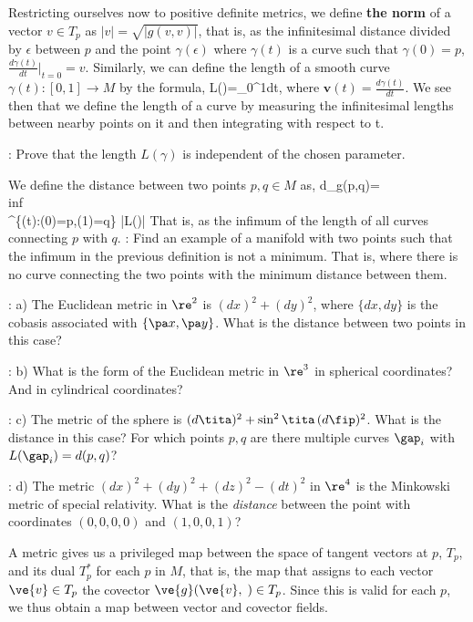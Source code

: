 Restricting ourselves now to positive definite metrics,
we define {\bf the norm} of a vector $v \in T_p$ as
$|v| = \sqrt{|g(v,v)|} $, that is, as the infinitesimal distance divided
by $\epsilon$ between $p$ and the point $\gamma (\epsilon)$ where
$\gamma(t)$ is a curve such that $\gamma (0) = p$, 
$\frac{d\gamma(t)}{dt}|_{t=0} = v$.
Similarly, we can define the length of a smooth curve
$\gamma(t):[0,1] \rightarrow M$ by the formula,
\beq
L(\lap)=\int_0^1\;dt,
\eeq
where $\mathbf{v}(t)=\frac{d\gamma(t)}{dt} $. We see then that we define the
length of a curve by measuring the infinitesimal lengths between nearby points on it and then integrating with respect to t.

\espa
\ejer: Prove that the length $L(\gamma) $ is independent of the chosen parameter.

We define the distance
between two points $p,q \in M$ as,
\beq
d_g(p,q)=\\inf\\^{\{\gamma(t)\;:\;\gamma(0)=p,\gamma(1)=q\}}\earr
|L(\gamma)|
\eeq
That is, as the infimum of the length of all curves connecting
$p$ with $q$.
\espa
\ejer: Find an example of a manifold with two points such that
the infimum in the previous definition is not a minimum. That is,
where there is no curve connecting the two points with the
minimum distance between them.
\espa

\ejer: a) The Euclidean metric in $\re^2$ is $(dx)^2+(dy)^2$, where $\{dx,dy\}$ 
is the cobasis associated
with $\{\pa x,\pa y\}$. What is the distance between two points in this case?

\ejer: b) What is the form of the Euclidean metric in $\re^3$ 
in spherical coordinates? And in cylindrical coordinates?

\ejer: c) The metric of the sphere is
$(d\tita)^2+\sin^2\tita\,(d\fip)^2$. 
What is the distance in this case? For which points $p,q$ are there
multiple curves $\gap_i$ with $L(\gap_i)=d(p,q)$?


\ejer: d) The metric $(dx)^2+(dy)^2+(dz)^2-(dt)^2$ in $\re^4$ is the Minkowski metric of
special relativity. What is the {\it distance} between the point with
coordinates $(0,0,0,0)$ and $(1,0,0,1)$?

A metric gives us a privileged map between the space of
tangent vectors at $p$, $T_p$, and its dual $T_p^*$ for each $p$ in $M$, 
that is, the map
that assigns to each vector $\ve{v}\in T_p$ the covector $\ve{g}(\ve{v},\;)\in T_p$. 
Since this is valid for each $p$, we thus obtain a map between vector
and covector fields.%

